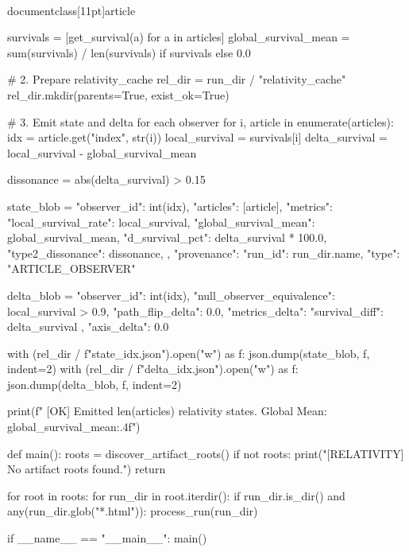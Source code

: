 \\documentclass[11pt]{article}
\begin{document}
\begin{CodeBlock}
    survivals = [get_survival(a) for a in articles]
    global_survival_mean = sum(survivals) / len(survivals) if survivals else 0.0

    # 2. Prepare relativity_cache
    rel_dir = run_dir / "relativity_cache"
    rel_dir.mkdir(parents=True, exist_ok=True)

    # 3. Emit state and delta for each observer
    for i, article in enumerate(articles):
        idx = article.get("index", str(i))
        local_survival = survivals[i]
        delta_survival = local_survival - global_survival_mean
        
        dissonance = abs(delta_survival) > 0.15 
        
        state_blob = {
            "observer_id": int(idx),
            "articles": [article],
            "metrics": {
                "local_survival_rate": local_survival,
                "global_survival_mean": global_survival_mean,
                "d_survival_pct": delta_survival * 100.0,
                "type2_dissonance": dissonance,
            },
            "provenance": {
                "run_id": run_dir.name,
                "type": "ARTICLE_OBSERVER"
            }
        }
        
        delta_blob = {
            "observer_id": int(idx),
            "null_observer_equivalence": local_survival > 0.9,
            "path_flip_delta": 0.0,
            "metrics_delta": {
                "survival_diff": delta_survival
            },
            "axis_delta": 0.0
        }
        
        with (rel_dir / f"state_{idx}.json").open("w") as f:
            json.dump(state_blob, f, indent=2)
        with (rel_dir / f"delta_{idx}.json").open("w") as f:
            json.dump(delta_blob, f, indent=2)

    print(f"  [OK] Emitted {len(articles)} relativity states. Global Mean: {global_survival_mean:.4f}")

def main():
    roots = discover_artifact_roots()
    if not roots:
        print("[RELATIVITY] No artifact roots found.")
        return

    for root in roots:
        for run_dir in root.iterdir():
            if run_dir.is_dir() and any(run_dir.glob("*.html")):
                process_run(run_dir)

if __name__ == "__main__":
    main()

\end{CodeBlock}
\end{document}
